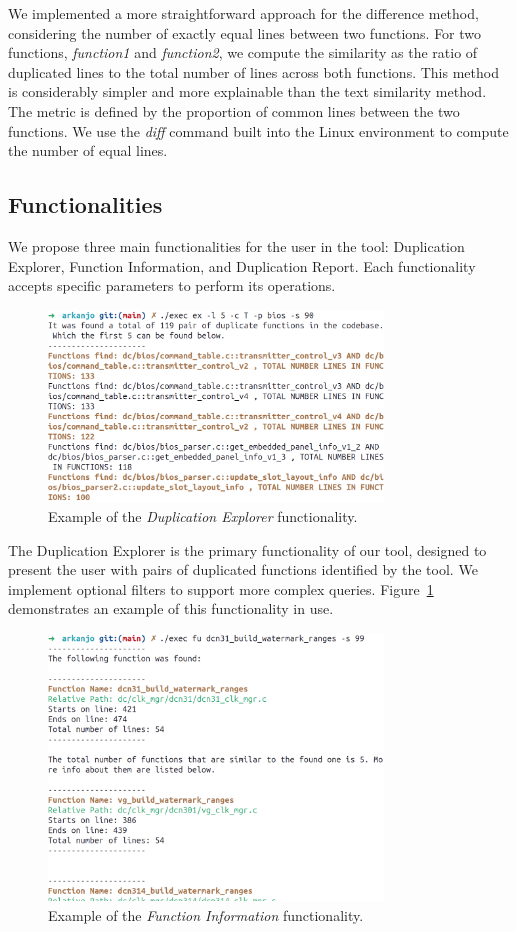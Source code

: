 \documentclass[conference]{IEEEtran}
\begin{document}
We implemented a more straightforward approach for the difference method,
considering the number of exactly equal lines between two functions.
For two functions, \textit{function1} and \textit{function2}, we compute the similarity as the 
ratio of duplicated lines to the total number of lines across both functions.
This method is considerably simpler and more explainable than the text similarity method. 
The metric is defined by the proportion of common lines between the two functions. 
We use the \textit{diff} command built into the Linux environment to compute the number of equal lines.

\subsection{Functionalities}

We propose three main functionalities for the user in the tool: Duplication Explorer, Function Information, and Duplication Report. Each functionality accepts
specific parameters to perform its operations.

\begin{figure}[ht]
\centering
\includegraphics[width=3.5in]{fig/explorer_example.png}
\caption{Example of the \textit{Duplication Explorer} functionality.}
\label{fig:explorer_ex}
\end{figure}

The Duplication Explorer is the primary functionality of our tool, designed to present
the user with pairs of duplicated functions identified by the tool. We implement optional
filters to support more complex queries. Figure~\ref{fig:explorer_ex} demonstrates an example of this functionality in use.


\begin{figure}[ht]
\centering
\includegraphics[width=3.5in]{fig/function_example.png}
\caption{Example of the \textit{Function Information} functionality.}
\label{fig:function_ex}
\end{figure}
\end{document}
